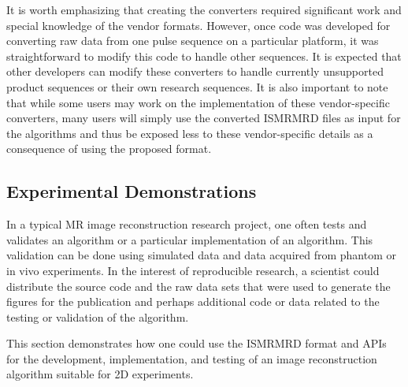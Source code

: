 \documentclass[12pt, draft]{article}
\begin{document}
It is worth emphasizing that creating the converters required significant work and special knowledge of the vendor formats. However, once code was developed for converting raw data from one pulse sequence on a particular platform, it was straightforward to modify this code to handle other sequences. It is expected that other developers can modify these converters to handle currently unsupported product sequences or their own research sequences. It is also important to note that while some users may work on the implementation of these vendor-specific converters, many users will simply use the converted ISMRMRD files as input for the algorithms and thus be exposed less to these vendor-specific details as a consequence of using the proposed format. 

\subsection*{Experimental Demonstrations}
In a typical MR image reconstruction research project, one often tests and validates an algorithm or a particular implementation of an algorithm. This validation can be done using simulated data and data acquired from phantom or in vivo experiments.  In the interest of reproducible research, a scientist could distribute the source code and the raw data sets that were used to generate the figures for the publication and perhaps additional code or data related to the testing or validation of the algorithm.

This section demonstrates how one could use the ISMRMRD format and APIs for the development, implementation, and testing of an image reconstruction algorithm suitable for 2D experiments.
\end{document}
